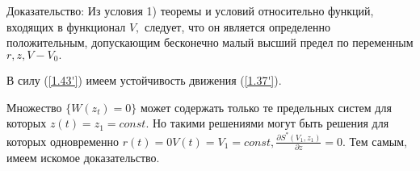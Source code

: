Доказательство:
Из условия 1) теоремы и условий относительно функций, входящих в функционал $V,$ следует, что он является определенно положительным, допускающим бесконечно малый высший предел по переменным $r, z, V - V_0.$

В силу (\ref{1.43'}) имеем устойчивость движения (\ref{1.37'}).

Множество $\lbrace W(z_t) = 0 \rbrace$ может содержать только те предельных систем для которых $z(t) = z_1 = const.$ Но такими решениями могут быть решения для которых одновременно $r(t) = 0 V(t) = V_1 = const, \frac{\partial S^{*} (V_1, z_1)}{\partial z} = 0.$ Тем самым, имеем искомое доказательство. 
